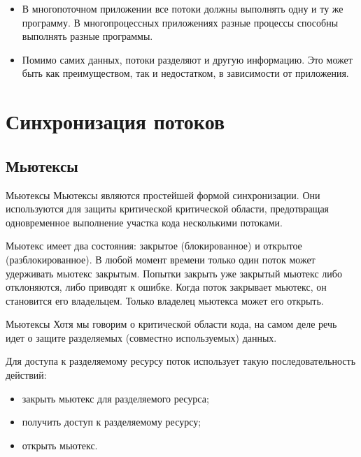 \documentclass{beamer}
\begin{document}
\begin{frame}{}
    \begin{itemize}
        \item В многопоточном приложении все потоки должны выполнять одну и ту же программу. В многопроцессных приложениях разные процессы способны выполнять разные программы.
        \item Помимо самих данных, потоки разделяют и другую информацию. Это может быть как преимуществом, так и недостатком, в зависимости от приложения.
    \end{itemize}
\end{frame}

\section{Синхронизация потоков}

\subsection{Мьютексы}

\begin{frame}{Мьютексы}
    Мьютексы являются простейшей формой синхронизации. Они используются для защиты критической критической области, предотвращая одновременное выполнение участка кода несколькими потоками. 
    
    Мьютекс имеет два состояния: закрытое (блокированное) и открытое (разблокированное). В любой момент времени только один поток может удерживать мьютекс закрытым. Попытки закрыть уже закрытый мьютекс либо отклоняются, либо приводят к ошибке. Когда поток закрывает мьютекс, он становится его владельцем. Только владелец мьютекса может его открыть.
\end{frame}

\begin{frame}{Мьютексы}
    Хотя мы говорим о критической области кода, на самом деле речь идет о защите разделяемых (совместно используемых) данных.
    
    Для доступа к разделяемому ресурсу поток использует такую последовательность действий:
    \begin{itemize}
        \item закрыть мьютекс для разделяемого ресурса;
        \item получить доступ к разделяемому ресурсу;
        \item открыть мьютекс.
    \end{itemize}
\end{frame}
\end{document}
